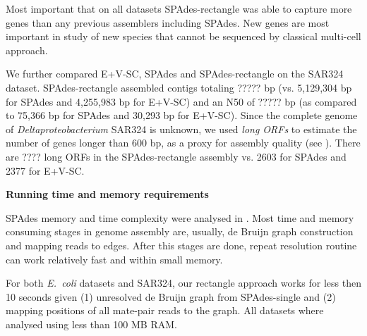 \documentclass[a4paper]{article}
\def\ecoli{\emph{E.~coli}}
\def\spades{SPAdes}
\begin{document}
Most important that on all datasets {\spades}-rectangle was able to capture more genes than any previous assemblers including {\spades}. New genes are most important in study of new species that cannot be sequenced by classical multi-cell approach.

We further compared E+V-SC, {\spades} and {\spades}-rectangle on the SAR324 dataset.
{\spades}-rectangle assembled contigs totaling ????? bp
(vs. 5,129,304 bp for {\spades} and 4,255,983 bp for E+V-SC) and an N50 of ????? bp (as compared to 75,366 bp for {\spades} and 30,293 bp for E+V-SC).
Since the complete genome of \emph{Deltaproteobacterium} SAR324 is unknown,
we used {\em long ORFs} to estimate the number of genes longer than 600 bp, as a proxy for assembly quality (see \cite{Chitsaz2011}).
There are ???? long ORFs in the {\spades}-rectangle assembly
vs. 2603 for {\spades} and 2377 for E+V-SC.



\textbf{Running time and memory requirements}

SPAdes memory and time complexity were analysed in \cite{SPAdes}. Most time and memory consuming stages in genome assembly are, usually, de Bruijn graph construction and mapping reads to edges. After this stages are done, repeat resolution routine can work relatively fast and within small memory.

For both {\ecoli} datasets and SAR324, our rectangle approach works for less then 10 seconds given (1) unresolved de Bruijn graph from SPAdes-single and (2) mapping positions of all mate-pair reads to the graph. All datasets where analysed using less than 100 MB RAM.
\end{document}

